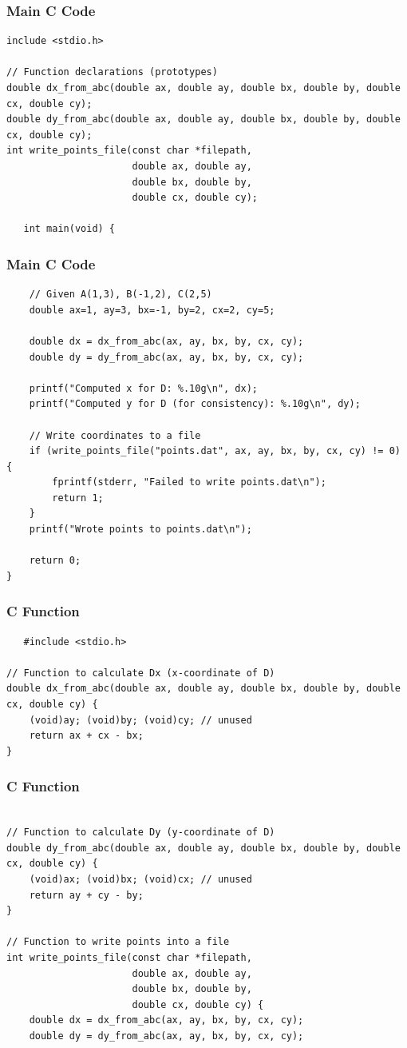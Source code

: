 \documentclass{beamer}
\begin{document}
\begin{frame}[fragile]
\frametitle{Main C Code}
   \begin{lstlisting}
include <stdio.h>

// Function declarations (prototypes)
double dx_from_abc(double ax, double ay, double bx, double by, double cx, double cy);
double dy_from_abc(double ax, double ay, double bx, double by, double cx, double cy);
int write_points_file(const char *filepath,
                      double ax, double ay,
                      double bx, double by,
                      double cx, double cy);

   int main(void) {

   \end{lstlisting}
	\end{frame}
\begin{frame}[fragile]
\frametitle{Main C Code}
   \begin{lstlisting}
    // Given A(1,3), B(-1,2), C(2,5)
    double ax=1, ay=3, bx=-1, by=2, cx=2, cy=5;

    double dx = dx_from_abc(ax, ay, bx, by, cx, cy);
    double dy = dy_from_abc(ax, ay, bx, by, cx, cy);

    printf("Computed x for D: %.10g\n", dx);
    printf("Computed y for D (for consistency): %.10g\n", dy);

    // Write coordinates to a file
    if (write_points_file("points.dat", ax, ay, bx, by, cx, cy) != 0) {
        fprintf(stderr, "Failed to write points.dat\n");
        return 1;
    }
    printf("Wrote points to points.dat\n");

    return 0;
}
   \end{lstlisting}
\end{frame}

\begin{frame}[fragile]
\frametitle{C Function}
   \begin{lstlisting}
   #include <stdio.h>

// Function to calculate Dx (x-coordinate of D)
double dx_from_abc(double ax, double ay, double bx, double by, double cx, double cy) {
    (void)ay; (void)by; (void)cy; // unused
    return ax + cx - bx;
}
   \end{lstlisting}
\end{frame}

\begin{frame}[fragile]
\frametitle{C Function}
     \begin{lstlisting}

// Function to calculate Dy (y-coordinate of D)
double dy_from_abc(double ax, double ay, double bx, double by, double cx, double cy) {
    (void)ax; (void)bx; (void)cx; // unused
    return ay + cy - by;
}

// Function to write points into a file
int write_points_file(const char *filepath,
                      double ax, double ay,
                      double bx, double by,
                      double cx, double cy) {
    double dx = dx_from_abc(ax, ay, bx, by, cx, cy);
    double dy = dy_from_abc(ax, ay, bx, by, cx, cy);
     \end{lstlisting}
     \end{frame}
\end{document}
